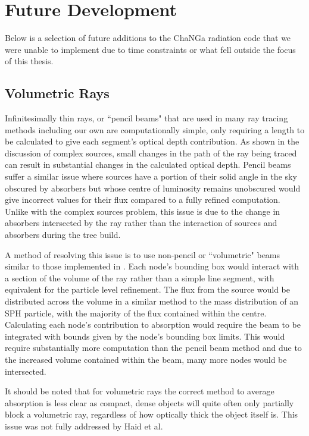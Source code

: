 \section {Future Development}

Below is a selection of future additions to the ChaNGa radiation code that we were unable to implement due to time constraints or what fell outside the focus of this thesis.

\subsection{Volumetric Rays}

Infinitesimally thin rays, or ``pencil beams" that are used in many ray tracing methods including our own are computationally simple, only requiring a length to be calculated to give each segment's optical depth contribution. As shown in the discussion of complex sources, small changes in the path of the ray being traced can result in substantial changes in the calculated optical depth. Pencil beams suffer a similar issue where sources have a portion of their solid angle in the sky obscured by absorbers but whose centre of luminosity remains unobscured would give incorrect values for their flux compared to a fully refined computation. Unlike with the complex sources problem, this issue is due to the change in absorbers intersected by the ray rather than the interaction of sources and absorbers during the tree build.

A method of resolving this issue is to use non-pencil or ``volumetric" beams similar to those implemented in \citet{treeRay}. Each node's bounding box would interact with a section of the volume of the ray rather than a simple line segment, with equivalent for the particle level refinement. The flux from the source would be distributed across the volume in a similar method to the mass distribution of an SPH particle, with the majority of the flux contained within the centre. Calculating each node's contribution to absorption would require the beam to be integrated with bounds given by the node's bounding box limits. This would require substantially more computation than the pencil beam method and due to the increased volume contained within the beam, many more nodes would be intersected. 

It should be noted that for volumetric rays the correct method to average absorption is less clear as compact, dense objects will quite often only partially block a volumetric ray, regardless of how optically thick the object itself is. This issue was not fully addressed by Haid et al.

